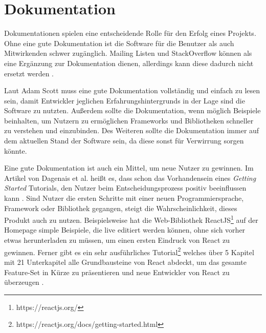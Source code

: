 \section{Dokumentation} \label{sec:Documentation}


Dokumentationen spielen eine entscheidende Rolle für den Erfolg eines Projekts.
Ohne eine gute Dokumentation ist die Software für die Benutzer als auch Mitwirkenden schwer zugänglich.
Mailing Listen und StackOverflow können als eine Ergänzung zur Dokumentation dienen, allerdings kann
diese dadurch nicht ersetzt werden \cite{bangerthWhatMakesComputational2013}. %

\bigskip
\noindent


\noindent
Laut Adam Scott muss eine gute Dokumentation vollständig und einfach zu lesen sein, damit Entwickler
jeglichen Erfahrungshintergrunds in der Lage sind die Software zu nutzten. Außerdem sollte 
die Dokumentation, wenn möglich Beispiele beinhalten, um Nutzern zu ermöglichen Frameworks und Bibliotheken 
schneller zu verstehen und einzubinden. Des Weiteren sollte die Dokumentation immer auf dem aktuellen 
Stand der Software sein, da diese sonst für Verwirrung sorgen könnte.
\cite{scottEightRulesGood2018}


Eine gute Dokumentation ist auch ein Mittel, um neue Nutzer zu gewinnen. Im Artikel von Dagenais et al. heißt es,
dass schon das Vorhandensein eines \textit{Getting Started} Tutorials, den Nutzer beim
Entscheidungsprozess positiv beeinflussen kann \cite{dagenaisDeveloperDocumentation}. %
Sind Nutzer die ersten Schritte mit einer neuen Programmiersprache, Framework oder Bibliothek
gegangen, steigt die Wahrscheinlichkeit, dieses Produkt auch zu nutzen.
Beispielsweise hat die Web-Bibliothek ReactJS\footnote{https://reactjs.org/} auf der Homepage simple
Beispiele, die live editiert werden können, ohne sich vorher etwas herunterladen zu müssen, um einen
ersten Eindruck von React zu gewinnen.
Ferner gibt es ein sehr ausführliches Tutorial\footnote{https://reactjs.org/docs/getting-started.html}
welches über 5 Kapitel mit 21 Unterkapitel alle Grundbausteine von React abdeckt, um das gesamte
Feature-Set in Kürze zu präsentieren und neue Entwickler von React zu überzeugen \cite{ReactTutorial}.

